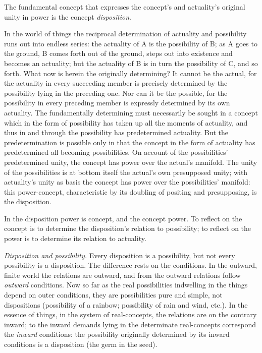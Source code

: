 \documentclass[12pt]{book}
\begin{document}
The fundamental concept that expresses the concept's and actuality's
original unity in power is the concept \emph{disposition}.

In the world of things the reciprocal determination of actuality and
possibility runs out into endless series: the actuality of A is the
possibility of B; as A goes to the ground, B comes forth out of the
ground, steps out into existence and becomes an actuality; but the
actuality of B is in turn the possibility of C, and so forth. What
now is herein the originally determining? It cannot be the actual,
for the actuality in every succeeding member is precisely determined
by the possibility lying in the preceding one. Nor can it be the
possible, for the possibility in every preceding member is expressly
determined by its own actuality. The fundamentally determining must
necessarily be sought in a concept which in the form of possibility
has taken up all the moments of actuality, and thus in and through
the possibility has predetermined actuality. But the predetermination
is possible only in that the concept in the form of actuality has
predetermined all becoming possibilities. On account of the
possibilities' predetermined unity, the concept has power over the
actual's manifold. The unity of the possibilities is at bottom
itself the actual's own presupposed unity; with actuality's unity as
basis the concept has power over the possibilities' manifold: this
power-concept, characteristic by its doubling of positing and
presupposing, is the disposition.

In the disposition power is concept, and the concept power. To
reflect on the concept is to determine the disposition's relation to
possibility; to reflect on the power is to determine its relation to
actuality.

\emph{Disposition and possibility.} Every disposition is a
possibility, but not every possibility is a disposition. The
difference rests on the conditions. In the outward, finite world
the relations are outward, and from the outward relations follow
\emph{outward} conditions. Now so far as the real possibilities
indwelling in the things depend on outer conditions, they are
possibilities pure and simple, not dispositions (possibility of a
rainbow; possibility of rain and wind, etc.). In the essence of
things, in the system of real-concepts, the relations are on the
contrary inward; to the inward demands lying in the determinate
real-concepts correspond the \emph{inward} conditions: the
possibility originally determined by its inward conditions is a
disposition (the germ in the seed).
\end{document}
